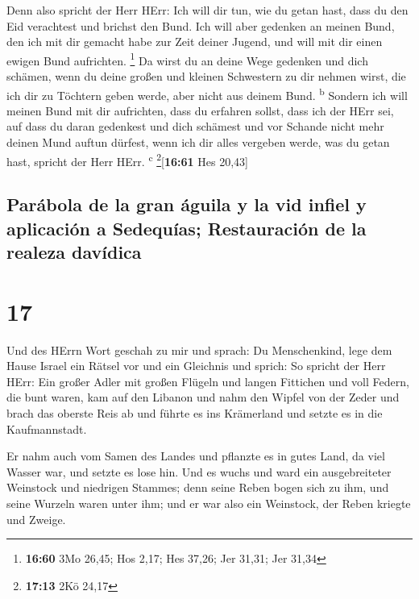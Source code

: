  Denn also spricht der Herr HErr: Ich will dir tun, wie
du getan hast, dass du den Eid verachtest und brichst den Bund.
 Ich will aber gedenken an meinen Bund, den ich mit dir
gemacht habe zur Zeit deiner Jugend, und will mit dir einen ewigen Bund
aufrichten. \footnote{\textbf{16:60} 3Mo 26,45; Hos 2,17; Hes 37,26; Jer
  31,31; Jer 31,34}  Da wirst du an deine Wege gedenken
und dich schämen, wenn du deine großen und kleinen Schwestern zu dir
nehmen wirst, die ich dir zu Töchtern geben werde, aber nicht aus deinem
Bund. \textsuperscript{b}  Sondern ich will meinen Bund
mit dir aufrichten, dass du erfahren sollst, dass ich der HErr sei,
 auf dass du daran gedenkest und dich schämest und vor
Schande nicht mehr deinen Mund auftun dürfest, wenn ich dir alles
vergeben werde, was du getan hast, spricht der Herr HErr.
\textsuperscript{c} \footnote{\textbf{17:13} 2Kö 24,17}{[}\textbf{16:61}
Hes 20,43{]}

\hypertarget{paruxe1bola-de-la-gran-uxe1guila-y-la-vid-infiel-y-aplicaciuxf3n-a-sedequuxedas-restauraciuxf3n-de-la-realeza-davuxeddica}{%
\subsection{Parábola de la gran águila y la vid infiel y aplicación a
Sedequías; Restauración de la realeza
davídica}\label{paruxe1bola-de-la-gran-uxe1guila-y-la-vid-infiel-y-aplicaciuxf3n-a-sedequuxedas-restauraciuxf3n-de-la-realeza-davuxeddica}}

\hypertarget{section-16}{%
\section{17}\label{section-16}}

 Und des HErrn Wort geschah zu mir und sprach:
 Du Menschenkind, lege dem Hause Israel ein Rätsel vor und
ein Gleichnis  und sprich: So spricht der Herr HErr: Ein
großer Adler mit großen Flügeln und langen Fittichen und voll Federn,
die bunt waren, kam auf den Libanon und nahm den Wipfel von der Zeder
 und brach das oberste Reis ab und führte es ins
Krämerland und setzte es in die Kaufmannstadt.

 Er nahm auch vom Samen des Landes und pflanzte es in
gutes Land, da viel Wasser war, und setzte es lose hin. 
Und es wuchs und ward ein ausgebreiteter Weinstock und niedrigen
Stammes; denn seine Reben bogen sich zu ihm, und seine Wurzeln waren
unter ihm; und er war also ein Weinstock, der Reben kriegte und Zweige.

